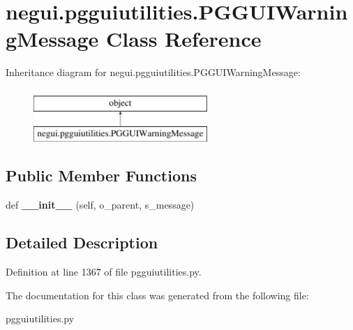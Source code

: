 \hypertarget{classnegui_1_1pgguiutilities_1_1PGGUIWarningMessage}{}\section{negui.\+pgguiutilities.\+P\+G\+G\+U\+I\+Warning\+Message Class Reference}
\label{classnegui_1_1pgguiutilities_1_1PGGUIWarningMessage}
Inheritance diagram for negui.\+pgguiutilities.\+P\+G\+G\+U\+I\+Warning\+Message\+:\begin{figure}[H]
\begin{center}
\leavevmode
\includegraphics[height=2.000000cm]{classnegui_1_1pgguiutilities_1_1PGGUIWarningMessage}
\end{center}
\end{figure}
\subsection*{Public Member Functions}
\begin{DoxyCompactItemize}
\item 
def {\bfseries \+\_\+\+\_\+init\+\_\+\+\_\+} (self, o\+\_\+parent, s\+\_\+message)\hypertarget{classnegui_1_1pgguiutilities_1_1PGGUIWarningMessage_a0ac338d8bcaa1e19be56a0b71a222d6e}{}\label{classnegui_1_1pgguiutilities_1_1PGGUIWarningMessage_a0ac338d8bcaa1e19be56a0b71a222d6e}

\end{DoxyCompactItemize}


\subsection{Detailed Description}


Definition at line 1367 of file pgguiutilities.\+py.



The documentation for this class was generated from the following file\+:\begin{DoxyCompactItemize}
\item 
pgguiutilities.\+py\end{DoxyCompactItemize}
